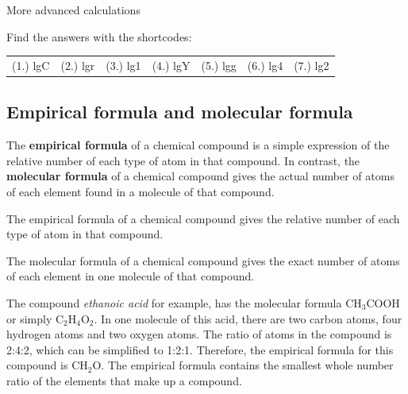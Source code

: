 \begin{exercises}{  More advanced calculations
      }
\begin{enumerate}[noitemsep, label=\textbf{\arabic*}. ]
\end{enumerate}
  \label{m38717**end}
\par {} Find the answers with the shortcodes:
 \par \begin{tabular}[h]{cccccc}
 (1.) lgC  &  (2.) lgr  &  (3.) lg1  &  (4.) lgY  &  (5.) lgg  &  (6.) lg4  &  (7.) lg2  & \end{tabular}
\end{exercises}
\subsection*{Empirical formula and molecular formula}
      \label{m38712*id280317}The \textbf{empirical formula} of a chemical compound is a simple expression of the relative number of each type of atom in that compound. In contrast, the \textbf{molecular formula} of a chemical compound gives the actual number of atoms of each element found in a molecule of that compound.\par 
\label{m38712*fhsst!!!underscore!!!id885}
 { \label{m38712*meaningfhsst!!!underscore!!!id885}
      \label{m38712*id280341}The empirical formula of a chemical compound gives the relative number of each type of atom in that compound. \par 
       } 
\label{m38712*fhsst!!!underscore!!!id888}
 { \label{m38712*meaningfhsst!!!underscore!!!id888}
      \label{m38712*id280360}The molecular formula of a chemical compound gives the exact number of atoms of each element in one molecule of that compound. \par 
       } 
      \label{m38712*id280372}The compound \textsl{ethanoic acid} for example, has the molecular formula $\text{CH}{}_{3}\text{COOH}$ or simply $\text{C}{}_{2}\text{H}{}_{4}\text{O}{}_{2}$. In one molecule of this acid, there are two carbon atoms, four hydrogen atoms and two oxygen atoms. The ratio of atoms in the compound is 2:4:2, which can be simplified to 1:2:1. Therefore, the empirical formula for this compound is $\text{CH}{}_{2}\text{O}$. The empirical formula contains the smallest whole number ratio of the elements that make up a compound.\par 
